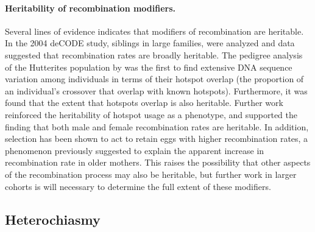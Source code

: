 \paragraph{Heritability of recombination modifiers.}
Several lines of evidence indicates that modifiers of recombination are heritable.
In the 2004 deCODE study, siblings in large families, were analyzed and data suggested that recombination rates are broadly heritable\cite{Kong2004}.
The pedigree analysis of the Hutterites population by \citet{Coop2008} was the first to find extensive DNA sequence variation among individuals in terms of their hotspot overlap (the proportion of an individual's crossover that overlap with known hotspots).
Furthermore, it was found that the extent that hotspots overlap is also heritable.
Further work reinforced the heritability of hotspot usage as a phenotype, and supported the finding that both male and female recombination rates are heritable\cite{Fledel-Alon2011}.
In addition, selection has been shown to act to retain eggs with higher recombination rates\cite{Ottolini2015}, a phenomenon previously suggested to explain the apparent increase in recombination rate in older mothers\cite{Kong2004}.
This raises the possibility that other aspects of the recombination process may also be heritable, but further work in larger cohorts is will necessary to determine the full extent of these modifiers.


\subsection{Heterochiasmy}

